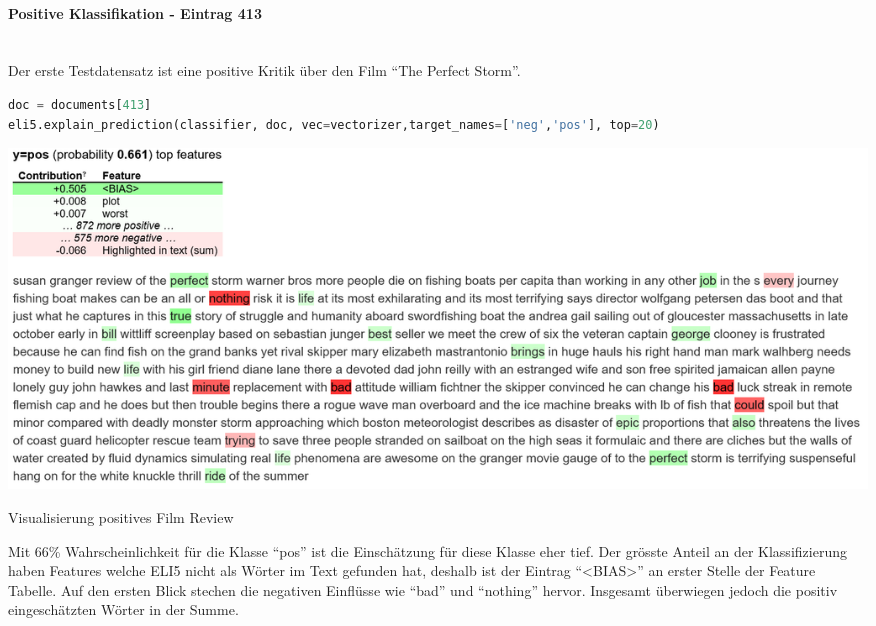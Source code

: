 \documentclass[
  12pt, %
  a4paper, %
  oneside, %
  openany, 
  numbers=noenddot, %
  BCOR=5mm, %
  parskip=half*, %
  thesis, %
]{bfhbook}
\newcommand{\parag}[1]{\paragraph*{#1}\mbox{}\\}
\begin{document}
\parag{Positive Klassifikation - Eintrag 413}
Der erste Testdatensatz ist eine positive Kritik über den Film ``The Perfect Storm''.
\begin{lstlisting}[language=Python]
doc = documents[413]
eli5.explain_prediction(classifier, doc, vec=vectorizer,target_names=['neg','pos'], top=20)
\end{lstlisting}
\label{eli5413}
\begin{center}
\begin{minipage}[t]{\linewidth}
\includegraphics[width=\textwidth]{Bilder/MovieReviews-SentimentClassification_ELI5-413.PNG}
\caption{Visualisierung positives Film Review}
\end{minipage}
\end{center}
Mit 66\% Wahrscheinlichkeit für die Klasse ``pos'' ist die Einschätzung für diese Klasse eher tief. Der grösste Anteil an der Klassifizierung haben Features welche ELI5 nicht als Wörter im Text gefunden hat, deshalb ist der Eintrag ``<BIAS>'' an erster Stelle der Feature Tabelle. Auf den ersten Blick stechen die negativen Einflüsse wie ``bad'' und ``nothing'' hervor. Insgesamt überwiegen jedoch die positiv eingeschätzten Wörter in der Summe.
\end{document}

